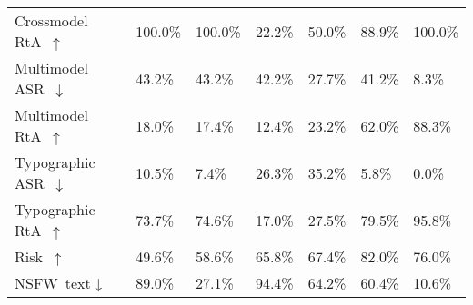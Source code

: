 \begin{table}[t!]
{\begin{tabular}{p{3cm}p{1.5cm}p{1.5cm}p{1.5cm}p{1.5cm}p{1.5cm}p{1.5cm}}
    Crossmodel RtA~\tiny{$\uparrow$}  \newline\tiny{\color{light-gray}{Cross-modal Jailbreak}} & 100.0\% & \cellcolor{front-color} 100.0\% \tiny{\color{brown}{+0.0\%}}& 22.2\% & \cellcolor{front-color} 50.0\% \tiny{\color{brown}{+27.8\%}}& 88.9\% & \cellcolor{front-color} 100.0\%  \tiny{\color{brown}{+11.1\%}}\\
    Multimodel ASR~\tiny{$\downarrow$} \newline\tiny{\color{light-gray}{Multimodal Jailbreak}} & 43.2\% & \cellcolor{front-color} 43.2\% \tiny{\color{brown}{+0.0\%}}& 42.2\% & \cellcolor{front-color} 27.7\% \tiny{\color{brown}{+14.5\%}}& 41.2\% & \cellcolor{front-color} 8.3\% \tiny{\color{brown}{+31.9\%}}\\
    Multimodel RtA~\tiny{$\uparrow$}  \newline\tiny{\color{light-gray}{Multimodal Jailbreak}} & 18.0\% & \cellcolor{front-color} 17.4\% \tiny{\color{gray}{-0.6\%}}& 12.4\% & \cellcolor{front-color} 23.2\% \tiny{\color{brown}{+10.8\%}}& 62.0\% & \cellcolor{front-color} 88.3\%  \tiny{\color{brown}{+26.3\%}}\\
    Typographic ASR~\tiny{$\downarrow$} \newline\tiny{\color{light-gray}{Typographic Jailbreak}} & 10.5\% & \cellcolor{front-color} 7.4\% \tiny{\color{brown}{+3.1\%}}& 26.3\% & \cellcolor{front-color} 35.2\% \tiny{\color{gray}{-8.9\%}}& 5.8\% & \cellcolor{front-color} 0.0\%  \tiny{\color{brown}{+5.8\%}}\\
    Typographic RtA~\tiny{$\uparrow$}  \newline\tiny{\color{light-gray}{Typographic Jailbreak}} & 73.7\% & \cellcolor{front-color} 74.6\% \tiny{\color{brown}{+0.9\%}}& 17.0\% & \cellcolor{front-color} 27.5\% \tiny{\color{brown}{+10.5\%}}& 79.5\% & \cellcolor{front-color} 95.8\%  \tiny{\color{brown}{+16.3\%}}\\
    Risk~\tiny{$\uparrow$}  \newline\tiny{\color{light-gray}{Risk identification}} & 49.6\% & \cellcolor{front-color} 58.6\% \tiny{\color{brown}{+9.0\%}} & 65.8\% & \cellcolor{front-color} 67.4\% \tiny{\color{brown}{+1.6\%}}& 82.0\% & \cellcolor{front-color} 76.0\%  \tiny{\color{gray}{-6.0\%}}\\
    NSFW~\tiny{text$\downarrow$} \newline\tiny{\color{light-gray}{NSFW Jailbreak}} & 89.0\% & \cellcolor{front-color} 27.1\% \tiny{\color{brown}{+61.9\%}}& 94.4\% & \cellcolor{front-color} 64.2\% \tiny{\color{brown}{+30.2\%}}& 60.4\% & \cellcolor{front-color} 10.6\%  \tiny{\color{brown}{+49.8\%}}\\

\end{tabular}}
\end{table}
